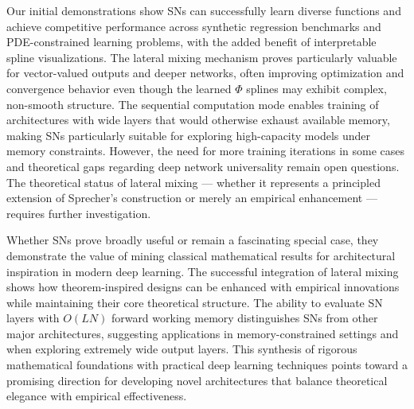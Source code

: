 \documentclass{article}
\theoremstyle{plain}
\theoremstyle{definition}
\theoremstyle{remark}
\begin{document}
Our initial demonstrations show SNs can successfully learn diverse functions and achieve competitive performance across synthetic regression benchmarks and PDE-constrained learning problems, with the added benefit of interpretable spline visualizations. The lateral mixing mechanism proves particularly valuable for vector-valued outputs and deeper networks, often improving optimization and convergence behavior even though the learned $\Phi$ splines may exhibit complex, non-smooth structure. The sequential computation mode enables training of architectures with wide layers that would otherwise exhaust available memory, making SNs particularly suitable for exploring high-capacity models under memory constraints. However, the need for more training iterations in some cases and theoretical gaps regarding deep network universality remain open questions. The theoretical status of lateral mixing --- whether it represents a principled extension of Sprecher's construction or merely an empirical enhancement --- requires further investigation.

Whether SNs prove broadly useful or remain a fascinating special case, they demonstrate the value of mining classical mathematical results for architectural inspiration in modern deep learning. The successful integration of lateral mixing shows how theorem-inspired designs can be enhanced with empirical innovations while maintaining their core theoretical structure. The ability to evaluate SN layers with $O(LN)$ forward working memory distinguishes SNs from other major architectures, suggesting applications in memory-constrained settings and when exploring extremely wide output layers. This synthesis of rigorous mathematical foundations with practical deep learning techniques points toward a promising direction for developing novel architectures that balance theoretical elegance with empirical effectiveness.

\bigskip
\end{document}
